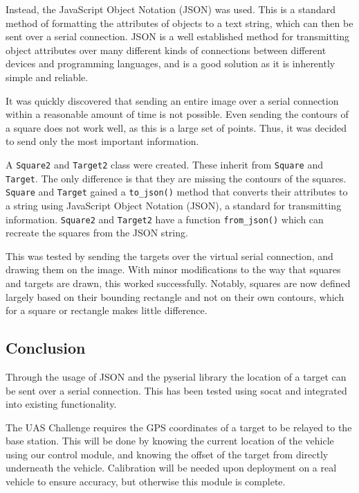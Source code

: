 \documentclass[11pt]{article}
\begin{document}
Instead, the JavaScript Object Notation (JSON) was used. This is a standard method of formatting the attributes of objects to a text string, which can then be sent over a serial connection. JSON is a well established method for transmitting object attributes over many different kinds of connections between different devices and programming languages, and is a good solution as it is inherently simple and reliable.

It was quickly discovered that sending an entire image over a serial connection within a reasonable amount of time is not possible. Even sending the contours of a square does not work well, as this is a large set of points. Thus, it was decided to send only the most important information.

A \lstinline|Square2| and \lstinline|Target2| class were created. These inherit from \lstinline|Square| and \lstinline|Target|. The only difference is that they are missing the contours of the squares. \lstinline|Square| and \lstinline|Target| gained a \lstinline|to_json()| method that converts their attributes to a string using JavaScript Object Notation (JSON), a standard for transmitting information. \lstinline|Square2| and \lstinline|Target2| have a function \lstinline|from_json()| which can recreate the squares from the JSON string.

This was tested by sending the targets over the virtual serial connection, and drawing them on the image. With minor modifications to the way that squares and targets are drawn, this worked successfully. Notably, squares are now defined largely based on their bounding rectangle and not on their own contours, which for a square or rectangle makes little difference.

\subsection{Conclusion}
Through the usage of JSON and the pyserial library the location of a target can be sent over a serial connection. This has been tested using socat and integrated into existing functionality.

The UAS Challenge requires the GPS coordinates of a target to be relayed to the base station. This will be done by knowing the current location of the vehicle using our control module, and knowing the offset of the target from directly underneath the vehicle. Calibration will be needed upon deployment on a real vehicle to ensure accuracy, but otherwise this module is complete.
\end{document}
